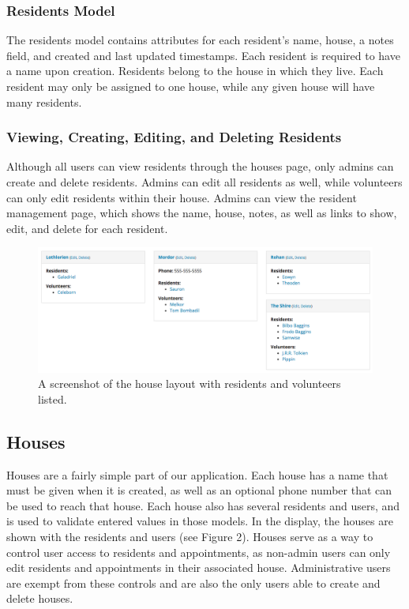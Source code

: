 \documentclass{sig-alternate}
\begin{document}
\subsubsection{Residents Model}
The residents model contains attributes for each resident's name, house, a notes field, and created and last updated timestamps. Each resident is required to have a name upon creation. Residents belong to the house in which they live. Each resident may only be assigned to one house, while any given house will have many residents.

\subsubsection{Viewing, Creating, Editing, and Deleting Residents}
Although all users can view residents through the houses page, only admins can create and delete residents. Admins can edit all residents as well, while volunteers can only edit residents within their house. Admins can view the resident management page, which shows the name, house, notes, as well as links to show, edit, and delete for each resident. 

\begin{figure}
\includegraphics[scale=0.2]{Houses}
\caption{A screenshot of the house layout with residents and volunteers listed.}
\end{figure}

\subsection{Houses}
Houses are a fairly simple part of our application. Each house has a name that must be given when it is created, as well as an optional phone number that can be used to reach that house. Each house also has several residents and users, and is used to validate entered values in those models. In the display, the houses are shown with the residents and users (see Figure 2). Houses serve as a way to control user access to residents and appointments, as non-admin users can only edit residents and appointments in their associated house. Administrative users are exempt from these controls and are also the only users able to create and delete houses.
\end{document}
